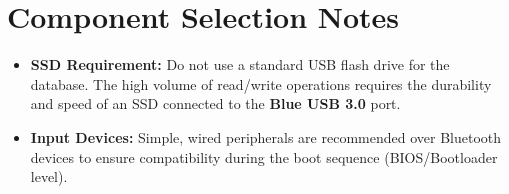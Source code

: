 \section{Component Selection Notes}
\begin{itemize}
	\item \textbf{SSD Requirement:} Do not use a standard USB flash drive for the database. The high volume of read/write operations requires the durability and speed of an SSD connected to the \textbf{Blue USB 3.0} port.
	\item \textbf{Input Devices:} Simple, wired peripherals are recommended over Bluetooth devices to ensure compatibility during the boot sequence (BIOS/Bootloader level).
\end{itemize}